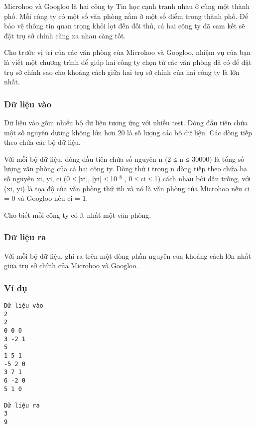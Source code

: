 



   Microhoo và Googloo là hai công ty Tin học cạnh tranh nhau ở cùng một thành phố. Mỗi công ty có một số văn phòng nằm ở một số điểm trong thành phố. Để bảo vệ thông tin quan trọng khỏi lọt đến đối thủ, cả hai công ty đã cam kết sẽ đặt trụ sở chính càng xa nhau càng tốt.  

   Cho trước vị trí của các văn phòng của Microhoo và Googloo, nhiệm vụ của bạn là viết một chương trình để giúp hai công ty chọn từ các văn phòng đã có để đặt trụ sở chính sao cho khoảng cách giữa hai trụ sở chính của hai công ty là lớn nhất.  

\subsubsection{   Dữ liệu vào  }

   Dữ liệu vào gồm nhiều bộ dữ liệu tương ứng với nhiều test. Dòng đầu tiên chứa một số nguyên dương không lớn hơn 20 là số lượng các bộ dữ liệu. Các dòng tiếp theo chứa các bộ dữ liệu.  

   Với mỗi bộ dữ liệu, dòng đầu tiên chứa số nguyên n (2 ≤ n ≤ 30000) là tổng số lượng văn phòng của cả hai công ty. Dòng thứ i trong n dòng tiếp theo chứa ba số nguyên xi, yi, ci (0 ≤ |xi|, |yi| ≤ 10   $^    8   $   , 0 ≤ ci ≤ 1) cách nhau bởi dấu trống, với (xi, yi) là tọa độ của văn phòng thứ ith và nó là văn phòng của Microhoo nếu ci = 0 và Googloo nếu ci = 1.  

   Cho biết mỗi công ty có ít nhất một văn phòng.  

\subsubsection{   Dữ liệu ra  }

   Với mỗi bộ dữ liệu, ghi ra trên một dòng phần nguyên của khoảng cách lớn nhất giữa trụ sở chính của Microhoo và Googloo.  

\subsubsection{   Ví dụ  }
\begin{verbatim}
Dữ liệu vào
2
2
0 0 0
3 -2 1
5
1 5 1 
-5 2 0
3 7 1
6 -2 0 
5 1 0

Dữ liệu ra
3
9
\end{verbatim}